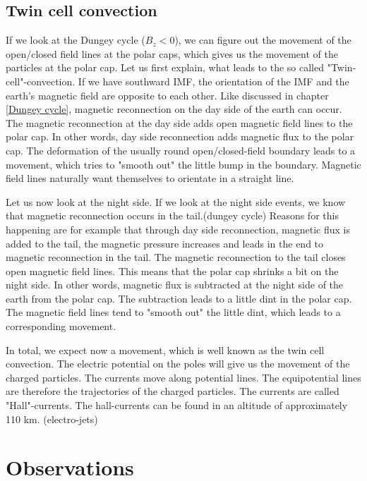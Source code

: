 \documentclass[10pt,a4paper]{article}
\begin{document}
\subsection{Twin cell convection \label{_CHAP_THEO_twin cell convection}}
If we look at the Dungey cycle ($B_z<0$), we can figure out the movement of the open/closed field lines at the polar caps, which gives us the movement of the particles at the polar cap. 
Let us first explain, what leads to the so called "Twin-cell"-convection. If we have southward IMF, the orientation of the IMF and the earth's magnetic field are opposite to each other. Like discussed in chapter \ref{Dungey cycle}, magnetic reconnection on the day side of the earth can occur. The magnetic reconnection at the day side adds open magnetic field lines to the polar cap. In other words, day side reconnection adds magnetic flux to the polar cap. 
The deformation of the usually round open/closed-field boundary leads to a movement, which tries to "smooth out" the little bump in the boundary. Magnetic field lines naturally want themselves to orientate in a straight line. 

Let us now look at the night side. If we look at the night side events, we know that magnetic reconnection occurs in the tail.(dungey cycle) Reasons for this happening are for example that through day side reconnection, magnetic flux is added to the tail, the magnetic pressure increases and leads in the end to magnetic reconnection in the tail. 
The magnetic reconnection to the tail closes open magnetic field lines. This means that the polar cap shrinks a bit on the night side. In other words, magnetic flux is subtracted at the night side of the earth from the polar cap. The subtraction leads to a little dint in the polar cap. The magnetic field lines tend to "smooth out" the little dint, which leads to a corresponding movement. 

In total, we expect now a movement, which is well known as the twin cell convection. The electric potential on the poles will give us the movement of the charged particles. The currents move along potential lines. The equipotential lines are therefore the trajectories of the charged particles. The currents are called "Hall"-currents. The hall-currents can be found in an altitude of approximately 110 km. (electro-jets)


\section{Observations}
\end{document}
